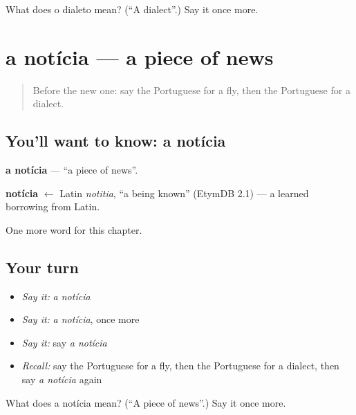 \begin{tcolorbox}[breakable,colback=teal!4,colframe=teal!35!black,title={Before you move on}]
What does o dialeto mean? (\textquotedblleft{}A dialect\textquotedblright{}.) Say it once more.
\end{tcolorbox}
\section[a notícia]{a notícia — a piece of news}

\label{lesson:PT-C245-noticia}



\begin{quote}
Before the new one: say the Portuguese for a fly, then the Portuguese for a dialect.
\end{quote}

\subsection*{You'll want to know: a notícia}
\textbf{a notícia} — \textquotedblleft{}a piece of news\textquotedblright{}.

\begin{cousinweb}
\textbf{notícia} $\leftarrow$ Latin \emph{notitia}, \textquotedblleft{}a being known\textquotedblright{} (EtymDB 2.1) — a learned borrowing from Latin.
\end{cousinweb}

\begin{grammarlens}[title={What you've built}]
One more word for this chapter.
\end{grammarlens}

\subsection*{Your turn}
\begin{itemize}
\raggedright
  \item \emph{Say it:} \emph{a notícia}
  \item \emph{Say it:} \emph{a notícia}, once more
  \item \emph{Say it:} say \emph{a notícia}
  \item \emph{Recall:} say the Portuguese for a fly, then the Portuguese for a dialect, then say \emph{a notícia} again
\end{itemize}

\begin{tcolorbox}[breakable,colback=teal!4,colframe=teal!35!black,title={Before you move on}]
What does a notícia mean? (\textquotedblleft{}A piece of news\textquotedblright{}.) Say it once more.
\end{tcolorbox}
